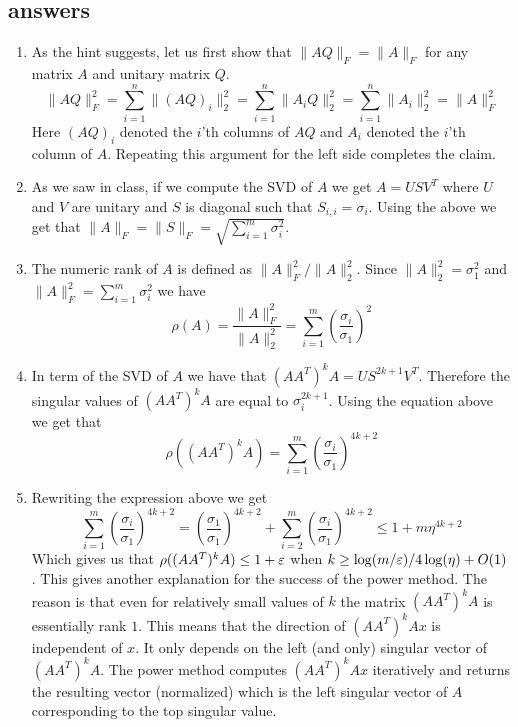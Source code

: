 \documentclass{article}
\begin{document}
\subsection*{answers}
\begin{enumerate}
\item As the hint suggests, let us first show that $\|AQ\|_{F} = \|A\|_{F}$ for any matrix $A$ and unitary matrix $Q$.
\[
\|AQ\|^2_{F} = \sum_{i=1}^{n} \|(AQ)_i\|^2_2 = \sum_{i=1}^{n} \|A_iQ\|^2_2 = \sum_{i=1}^{n} \|A_i\|^2_2 = \|A\|^2_F
\]
Here $(AQ)_i$ denoted the $i$'th columns of $AQ$ and $A_i$ denoted the $i$'th column of $A$. Repeating this argument for the left side completes the claim.
\item As we saw in class, if we compute the SVD of $A$ we get $A = USV^T$ where $U$ and $V$ are unitary and $S$ is diagonal such that $S_{i,i} = \sigma_i$.
Using the above we get that $\|A\|_F = \|S\|_F = \sqrt{\sum_{i=1}^{m}\sigma_{i}^{2}}$.
\item The numeric rank of $A$ is defined as $\|A\|_F^2/\|A\|_2^2$. Since $\|A\|_2^2 = \sigma_1^2$ and $\|A\|_F^2 = \sum_{i=1}^{m}\sigma_{i}^{2}$ we have
\[
\rho(A) = \frac{\|A\|_F^2}{\|A\|_2^2} = \sum_{i=1}^{m}(\frac{\sigma_{i}}{\sigma_1})^{2}
\]
\item In term of the SVD of $A$ we have that $(AA^T)^{k}A = US^{2k+1}V^T$. 
Therefore the singular values of $(AA^T)^{k}A$ are equal to $\sigma_i^{2k+1}$.
Using the equation above we get that
\[
\rho((AA^T)^{k}A)  = \sum_{i=1}^{m}(\frac{\sigma_{i}}{\sigma_1})^{4k+2}
\]
\item Rewriting the expression above we get
\[
\sum_{i=1}^{m}(\frac{\sigma_{i}}{\sigma_1})^{4k+2} = (\frac{\sigma_{1}}{\sigma_1})^{4k+2} + \sum_{i=2}^{m}(\frac{\sigma_{i}}{\sigma_1})^{4k+2} \le 1+ m\eta^{4k+2}
\]
Which gives us that $\rho((AA^T)^{k}A) \le 1+\varepsilon$ when $k \ge \log(m/\varepsilon)/4\log(\eta) + O(1)$.
This gives another explanation for the success of the power method. 
The reason is that even for relatively small values of $k$ the matrix $(AA^T)^{k}A$ is essentially rank $1$. 
This means that the direction of $(AA^T)^{k}Ax$ is independent of $x$.
It only depends on the left (and only) singular vector of $(AA^T)^{k}A$.
The power method computes $(AA^T)^{k}Ax$ iteratively and returns the resulting vector (normalized) which is the left singular vector of $A$ corresponding to the top singular value. 

\end{enumerate}
\end{document}
